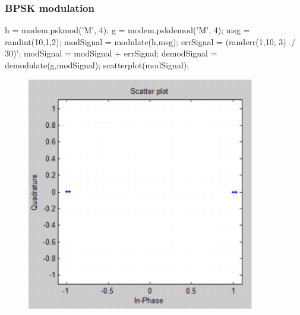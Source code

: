 \documentclass[10pt,a4paper]{article}
\begin{document}
\subsubsection{BPSK modulation}
h = modem.pskmod('M', 4);\newline 
g = modem.pskdemod('M', 4); \newline
msg = randint(10,1,2); \newline
modSignal = modulate(h,msg); \newline
errSignal = (randerr(1,10, 3) ./ 30)';\newline 
modSignal = modSignal + errSignal; \newline
demodSignal = demodulate(g,modSignal); \newline
scatterplot(modSignal);\newline
\begin{figure}[h]
\centering
\includegraphics[width=10cm]{1_1.png}  
\end{figure}
\newpage
\FloatBarrier
\end{document}
